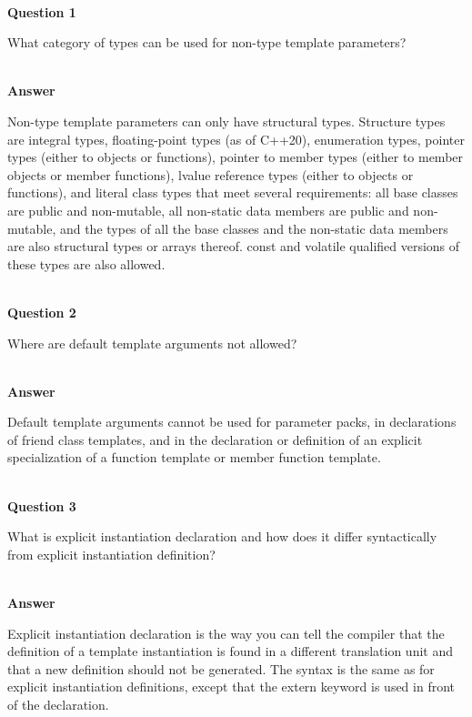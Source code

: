 \hspace*{\fill} \\ %
\noindent
\textbf{Question 1}

What category of types can be used for non-type template parameters?

\hspace*{\fill} \\ %
\noindent
\textbf{Answer}

Non-type template parameters can only have structural types. Structure types are integral types, floating-point types (as of C++20), enumeration types, pointer types (either to objects or functions), pointer to member types (either to member objects or member functions), lvalue reference types (either to objects or functions), and literal class types that meet several requirements: all base classes are public and non-mutable, all non-static data members are public and non-mutable, and the types of all the base classes and the non-static data members are also structural types or arrays thereof. const and volatile qualified versions of these types are also allowed.


\hspace*{\fill} \\ %
\noindent
\textbf{Question 2}

Where are default template arguments not allowed?

\hspace*{\fill} \\ %
\noindent
\textbf{Answer}

Default template arguments cannot be used for parameter packs, in declarations of friend class templates, and in the declaration or definition of an explicit specialization of a function template or member function template.

\hspace*{\fill} \\ %
\noindent
\textbf{Question 3}

What is explicit instantiation declaration and how does it differ syntactically from explicit instantiation definition?

\hspace*{\fill} \\ %
\noindent
\textbf{Answer}

Explicit instantiation declaration is the way you can tell the compiler that the definition of a template instantiation is found in a different translation unit and that a new definition should not be generated. The syntax is the same as for explicit instantiation definitions, except that the extern keyword is used in front of the declaration.

